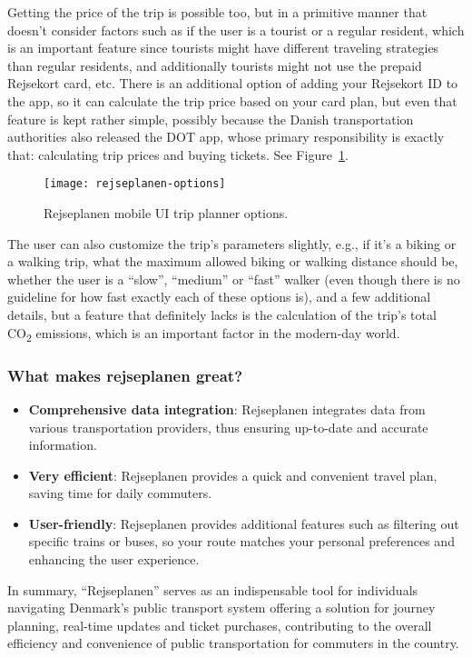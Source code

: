 Getting the price of the trip is possible too, but in a primitive manner that doesn't consider factors such as if the
user is a tourist or a regular resident, which is an important feature since tourists might have different traveling
strategies than regular residents, and additionally tourists might not use the prepaid Rejsekort card, etc.
There is an additional option of adding your Rejsekort ID to the app, so it can calculate the trip price based on your
card plan, but even that feature is kept rather simple, possibly because the Danish transportation authorities also
released the DOT app, whose primary responsibility is exactly that: calculating trip prices and buying tickets.
See Figure~\ref{fig:figure9}.

\begin{figure}
    \centering
    \texttt{[image: rejseplanen-options]}
    \caption{Rejseplanen mobile UI trip planner options.}
    \label{fig:figure9}
\end{figure}

The user can also customize the trip's parameters slightly, e.g., if it's a biking or a walking trip, what the maximum
allowed biking or walking distance should be, whether the user is a ``slow'', ``medium'' or ``fast'' walker (even though
there is no guideline for how fast exactly each of these options is), and a few additional details, but a feature that
definitely lacks is the calculation of the trip’s total \unit{CO_{2}} emissions, which is an important factor in the
modern-day world.

\subsubsection{What makes rejseplanen great?}
\begin{itemize}
    \item \textbf{Comprehensive data integration}: Rejseplanen integrates data from various transportation providers,
    thus ensuring up-to-date and accurate information.
    \item \textbf{Very efficient}: Rejseplanen provides a quick and convenient travel plan, saving time for daily
    commuters.
    \item \textbf{User-friendly}: Rejseplanen provides additional features such as filtering out specific trains or
    buses, so your route matches your personal preferences and enhancing the user experience.
\end{itemize}

In summary, ``Rejseplanen'' serves as an indispensable tool for individuals navigating Denmark's public transport system
offering a solution for journey planning, real-time updates and ticket purchases, contributing to the overall efficiency
and convenience of public transportation for commuters in the country.

